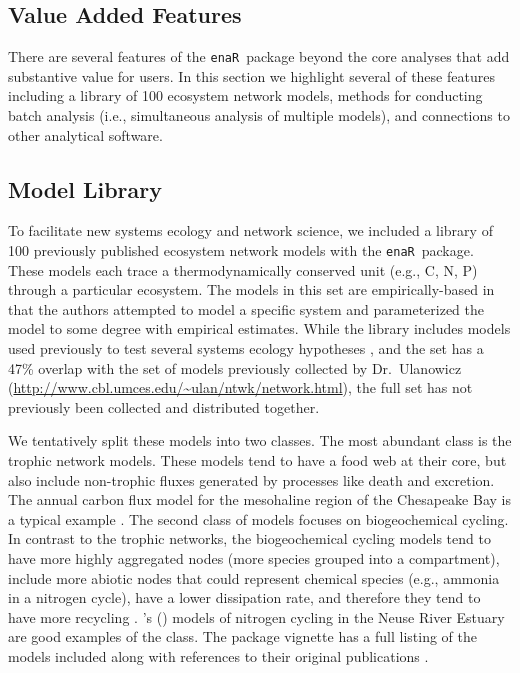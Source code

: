 \documentclass[11pt]{article}
\def\citeapos#1{\citeauthor{#1}'s (\citeyear{#1})}
\newcommand{\enaR}{\texttt{enaR}}
\begin{document}
\begin{spacing}{2}
\section{Value Added Features}
There are several features of the \enaR\ package beyond the core
analyses that add substantive value for users.  In this section we
highlight several of these features including a library of 100
ecosystem network models, methods for conducting batch analysis (i.e.,
simultaneous analysis of multiple models), and connections to other
analytical software.

\subsection{Model Library}
To facilitate new systems ecology and network science, we included a
library of 100 previously published ecosystem network models with the
\enaR\ package. These models each trace a thermodynamically conserved
unit (e.g., C, N, P) through a particular ecosystem.  The models in
this set are empirically-based in that the authors attempted to model
a specific system and parameterized the model to some degree with
empirical estimates.  While the library includes models used previously to
test several systems ecology hypotheses \citep{borrett10_idd,
  borrett10_hmg, salas11_did, borrett13}, and the set has a 47\%
overlap with the set of models previously collected by Dr.\ Ulanowicz
(\url{http://www.cbl.umces.edu/~ulan/ntwk/network.html}), the full
set has not previously been collected and distributed together.

We tentatively split these models into two classes.  The most
abundant class is the trophic network models. %
These models tend to have a food web at their core, but also include
non-trophic fluxes generated by processes like death and excretion.
The annual carbon flux model for the mesohaline region of the
Chesapeake Bay is a typical example \citep{baird89}.  The second class
of models focuses on biogeochemical cycling.  %
In contrast to the trophic networks, the biogeochemical cycling models
tend to have more highly aggregated nodes (more species grouped into a
compartment), include more abiotic nodes that could represent chemical
species (e.g., ammonia in a nitrogen cycle), have a lower dissipation
rate, and therefore they tend to have more recycling
\citep{christian96, borrett10_idd}.  \citeapos{christian03} models of
nitrogen cycling in the Neuse River Estuary are good examples of the
class.  The package vignette has a full listing of the models included
along with references to their original publications \citep{enar}.


\end{spacing}
\end{document}

